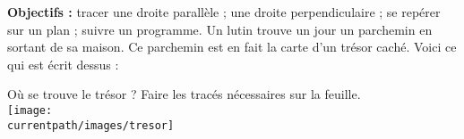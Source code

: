 \begin{changemargin}{-15mm}{-10mm}
\begin{activite}
   {\bf Objectifs :} tracer une droite parallèle ; une droite perpendiculaire ; se repérer sur un plan ; suivre un programme.
      Un lutin trouve un jour un parchemin en sortant de sa maison.
Ce parchemin est en fait la carte d’un trésor caché. Voici ce qui est écrit dessus :
      \begin{center}
      \end{center}
      Où se trouve le trésor ? Faire les tracés nécessaires sur la feuille. \\ [3mm]
         \texttt{[image: \\currentpath/images/tresor]}
\end{activite}
\end{changemargin}